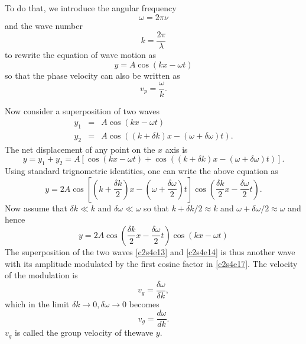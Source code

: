 To do that, we introduce the angular frequency
\begin{equation}\label{c2s4e9}
\omega = 2\pi\nu
\end{equation}
and the wave number
\begin{equation}\label{c2s4e10}
k = \frac{2\pi}{\lambda}
\end{equation}
to rewrite the equation of wave motion as
\begin{equation}\label{c2s4e11} 
y = A\cos(kx - \omega t)
\end{equation}
so that the phase velocity can also be written as
\begin{equation}\label{c2s4e12}
v_p = \frac{\omega}{k}.
\end{equation}

Now consider a superposition of two waves
\begin{eqnarray}
y_1 &=& A\cos(kx - \omega t) \label{c2s4e13} \\ 
y_2 &=& A\cos((k + \delta k)x - (\omega + \delta\omega)t). \label{c2s4e14}
\end{eqnarray}
The net displacement of any point on the $x$ axis is
\begin{equation}\label{c2s4e15}
y = y_1 + y_2 = A\left[\cos(kx-\omega t) + 
  \cos((k + \delta k)x - (\omega + \delta\omega)t)\right].
\end{equation}
Using standard trignometric identities, one can write the above equation as
\begin{equation}\label{c2s4e16}
y = 2A\cos\left[\left(k+\frac{\delta k}{2}\right)x - \left(\omega + 
\frac{\delta\omega}{2}\right)t\right]\cos\left(\frac{\delta k}{2}x - 
\frac{\delta\omega}{2} t\right).
\end{equation}
Now assume that $\delta k \ll k$ and $\delta\omega \ll \omega$ so that $k + 
\delta k/2 \approx k$ and $\omega + \delta\omega/2 \approx \omega$ and hence
\begin{equation}\label{c2s4e17}
y = 2A\cos\left(\frac{\delta k}{2}x - \frac{\delta\omega}{2}t\right)
    \cos(kx - \omega t)
\end{equation}
The superposition of the two waves \eqref{c2s4e13} and \eqref{c2s4e14} is thus
another wave with its amplitude modulated by the first cosine factor in
\eqref{c2s4e17}. The velocity of the modulation is
\begin{equation}\label{c2s4e18}
v_g = \frac{\delta\omega}{\delta k},
\end{equation}
which in the limit $\delta k \rightarrow 0, \delta\omega \rightarrow 0$ becomes
\begin{equation}\label{c2s4e19}
v_g = \frac{d\omega}{dk}.
\end{equation}
$v_g$ is called the group velocity of thewave $y$.

